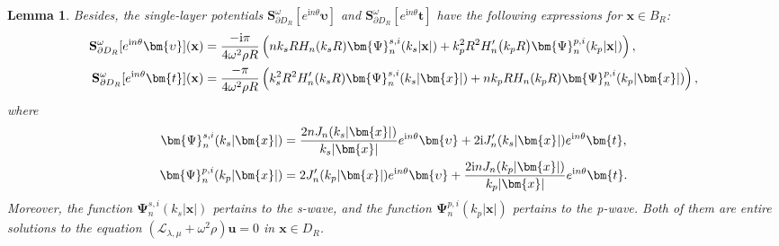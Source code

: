 \documentclass[11pt,reqno,twoside]{amsart}
\newtheorem{lem}{Lemma}[section]
\theoremstyle{definition}
\theoremstyle{remark}
\numberwithin{equation}{section}
\newcommand{\bx}{\mathbf{x}}
\begin{document}
\begin{lem}
	Besides, the single-layer potentials $\mathbf{S}_{\partial D_{R}}^{\omega}[e^{\mathrm{i}n\theta}\bm{\upsilon}]$ and $\mathbf{S}_{\partial D_{R}}^{\omega}[e^{\mathrm{i}n\theta}\bm{t}]$ have the following expressions for $\bx\in B_R$:
	\begin{align}\label{lem:qninut}
		\mathbf{S}_{\partial D_{R}}^{\omega}[e^{\mathrm{i}n\theta}\bm{\upsilon }](\bx)&=\frac{-\mathrm{i}\pi}{4\omega^{2}\rho R}\left(nk_{s}RH_{n}(k_{s}R)\bm{\Psi}_{n}^{s,i}(k_{s}|\bx|)+k_{p}^{2}R^{2}H_{n}^{\prime}\big(k_{p}R\big)\bm{\Psi}_{n}^{p,i}(k_{p}|\mathbf{x}|)\right),\\
		\mathbf{S}_{\partial D_{R}}^{\omega}[e^{\mathrm{i}n\theta}\bm{t}](\bx)&=\frac{-\pi}{4\omega^{2}\rho R}\left(k_{s}^{2}R^{2}H_{n}^{\prime}(k_{s}R)\bm{\Psi}_{n}^{s,i}(k_{s}|\bm{x}|)+nk_{p}RH_{n}(k_{p}R)\bm{\Psi}_{n}^{p,i}(k_{p}|\bm{x}|)\right),\notag
	\end{align}
	where
	\begin{align}
		\bm{\Psi}_{n}^{s,i}(k_{s}|\bm{x}|)&=\frac{2nJ_{n}(k_{s}|\bm{x}|)}{k_{s}|\bm{x}|}e^{\mathrm{i}n\theta}\bm{\upsilon}+2\mathrm{i}J_{n}^{\prime}(k_{s}|\bm{x}|)e^{\mathrm{i}n\theta}\bm{t},\label{lem:qni}\\
		\bm{\Psi}_{n}^{p,i}(k_{p}|\bm{x}|)&=2J_{n}^{\prime}(k_{p}|\bm{x}|)e^{\mathrm{i}n\theta}\bm{\upsilon}+\frac{2\mathrm{i}nJ_{n}(k_{p}|\bm{x}|)}{k_{p}|\bm{x}|}e^{\mathrm{i}n\theta}\bm{t}.\notag
	\end{align}
	Moreover, the function $\bm{\Psi}_{n}^{s,i}(k_{s}|\mathbf{x}|)$  pertains to the s-wave, and the function $\bm{\Psi}_{n}^{p,i}(k_p|\mathbf{x}|)$ pertains to the p-wave. Both of them are entire solutions to the equation $(\mathcal{L}_{\lambda,\mu}+\omega^{2}{\rho} )\mathbf{u}=0$ in $\bx\in{D}_{R}$.
\end{lem}
\end{document}

